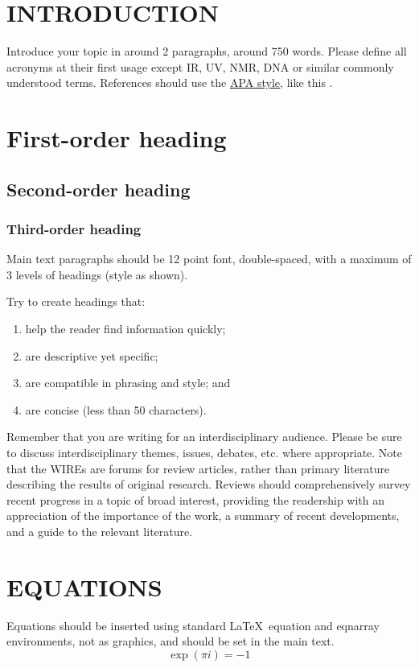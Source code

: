 \documentclass[12pt]{article}
\begin{document}
\section*{\sffamily \Large INTRODUCTION} 

Introduce your topic in around 2 paragraphs, around 750 words.  Please define all acronyms at their first usage except IR, UV, NMR, DNA or similar commonly understood terms.  References should use the \href{http://www.apastyle.org/learn/quick-guide-on-references.aspx}{APA style}, like this \cite{coulson1960present}.


\section*{\sffamily \Large First-order heading}
\subsection*{\sffamily \large Second-order heading}
\subsubsection*{\sffamily \normalsize Third-order heading}
Main text paragraphs should be 12 point font, double-spaced, with a maximum of 3 levels of headings (style as shown).

Try to create headings that:
\begin{enumerate}
\item  help the reader find information quickly; 
\item are descriptive yet specific; 
\item are compatible in phrasing and style; and 
\item are concise (less than 50 characters). 
\end{enumerate}

Remember that you are writing for an interdisciplinary audience. Please be sure to discuss interdisciplinary themes, issues, debates, etc. where appropriate. Note that the WIREs are forums for review articles, rather than primary literature describing the results of original research. Reviews should comprehensively survey recent progress in a topic of broad interest, providing the readership with an appreciation of the importance of the work, a summary of recent developments, and a guide to the relevant literature.

\section*{\sffamily \Large EQUATIONS}
Equations should be inserted using standard \LaTeX\ equation and eqnarray environments, not as graphics, and should be set in the main text.
\begin{equation}
\exp (\pi i) = -1
\end{equation}
\end{document}
